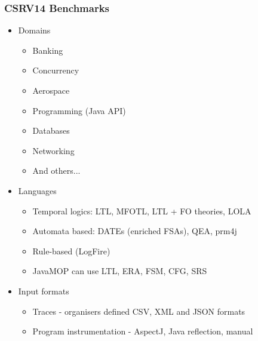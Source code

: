 \documentclass{beamer}
\begin{document}
\begin{frame}
\frametitle{CSRV14 Benchmarks}
\begin{itemize}
	\item Domains \begin{multicols}{2}
	\begin{itemize}
		\item Banking
		\item Concurrency
		\item Aerospace
		\item Programming (Java API)
		\item Databases
		\item Networking
		\item And others...
	\end{itemize}
	\end{multicols}
	\item Languages
	\begin{itemize}
		\item Temporal logics: LTL, MFOTL, LTL + FO theories, LOLA
		\item Automata based: DATEs (enriched FSAs), QEA, prm4j
		\item Rule-based (LogFire)
		\item JavaMOP can use LTL, ERA, FSM, CFG, SRS 
	\end{itemize}	
	\item Input formats
	\begin{itemize}
		\item Traces - organisers defined CSV, XML and JSON formats
		\item Program instrumentation - AspectJ, Java reflection, manual
	\end{itemize}	

\end{itemize}
\end{frame}
\end{document}
